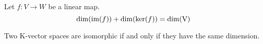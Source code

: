         \begin{theorem}
		Let $f: V \rightarrow W$ be a linear map.
	        \begin{equation}
	                \label{linalgebra:dimension_theorem}
	                \dim(\text{\upshape im}(f)) + \dim(\text{\upshape ker}(f)) = \dim(\text{\upshape V})
	        \end{equation}
        \end{theorem}

        \begin{theorem}\label{linalgebra:isomorphic_dimension}
		Two K-vector spaces are isomorphic if and only if they have the same dimension.
	\end{theorem}
